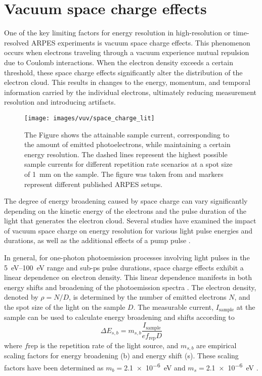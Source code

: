 \section{Vacuum space charge effects}
\label{sec:space_charge}

One of the key limiting factors for energy resolution in high-resolution or time-resolved ARPES experiments is vacuum space charge effects.
This phenomenon occurs when electrons traveling through a vacuum experience mutual repulsion due to Coulomb interactions.
When the electron density exceeds a certain threshold, these space charge effects significantly alter the distribution of the electron cloud.
This results in changes to the energy, momentum, and temporal information carried by the individual electrons, ultimately reducing measurement resolution and introducing artifacts.

\begin{figure}[b!]
	\centering
	\texttt{[image: images/vuv/space\_charge\_lit]}
	\caption{The Figure shows the attainable sample current, corresponding to the amount of emitted photoelectrons, while maintaining a certain energy resolution. The dashed lines represent the highest possible sample currents for different repetition rate scenarios at a spot size of \qty{1}{\milli\meter} on the sample. The figure was taken from \cite{corder_ultrafast_2018} and markers represent different published ARPES setups.}
	\label{fig:spacechargelit}
\end{figure}

The degree of energy broadening caused by space charge can vary significantly depending on the kinetic energy of the electrons and the pulse duration of the light that generates the electron cloud.
Several studies have examined the impact of vacuum space charge on energy resolution for various light pulse energies and durations, as well as the additional effects of a pump pulse \cite{corder_ultrafast_2018,plotzing_spin-resolved_2016,hellmann_vacuum_2009,graf_vacuum_2010,frietsch_high-order_2013}.

In general, for one-photon photoemission processes involving light pulses in the \qtyrange{5}{100}{\electronvolt} range and sub-\unit{\pico\second} pulse durations, space charge effects exhibit a linear dependence on electron density.
This linear dependence manifests in both energy shifts and broadening of the photoemission spectra \cite{corder_ultrafast_2018,plotzing_spin-resolved_2016}.
The electron density, denoted by $\rho = N/D$, is determined by the number of emitted electrons $N$, and the spot size of the light on the sample $D$.
The measurable current, $I_\text{sample}$ at the sample can be used to calculate energy broadening and shifts according to
\begin{equation}
	\Delta E_{s,b} = m_{s,b} \frac{I_\text{sample}}{e f_\text{rep} D}
	\label{eq:spacecharge}
\end{equation}
where $f\text{rep}$ is the repetition rate of the light source, and $m_{s,b}$ are empirical scaling factors for energy broadening (b) and energy shift (s). These scaling factors have been determined as $m_b=$\qty{2.1e-6}{\electronvolt} and $m_s=$\qty{2.1e-6}{\electronvolt} \cite{plotzing_spin-resolved_2016}.

